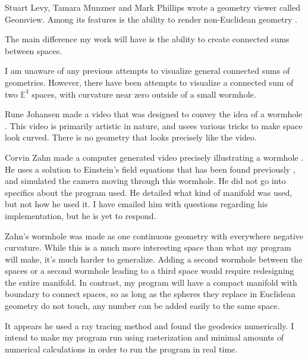 \documentclass[12pt]{amsart}
\begin{document}
Stuart Levy, Tamara Munzner and Mark Phillips wrote a geometry viewer called Geomview. Among its features is the ability to render non-Euclidean geometry \cite{Geomview}.

The main difference my work will have is the ability to create connected sums between spaces.



I am unaware of any previous attempts to visualize general connected sums of geometries. However, there have been attempts to visualize a connected sum of two $\mathbb{E}^3$ spaces, with curvature near zero outside of a small wormhole.

Rune Johansen made a video that was designed to convey the idea of a wormhole \cite{runevision}. This video is primarily artistic in nature, and usees various tricks to make space look curved. There is no geometry that looks precisely like the video.

Corvin Zahn made a computer generated video precisely illustrating a wormhole \cite{spacetimetravel}. He uses a solution to Einstein's field equations that has been found previously \cite{WormholeSolution}, and simulated the camera moving through this wormhole. He did not go into specifics about the program used. He detailed what kind of manifold was used, but not how he used it. I have emailed him with questions regarding his implementation, but he is yet to respond.

Zahn's wormhole was made as one continuous geometry with everywhere negative curvature. While this is a much more interesting space than what my program will make, it's much harder to generalize. Adding a second wormhole between the spaces or a second wormhole leading to a third space would require redesigning the entire manifold. In contrast, my program will have a compact manifold with boundary to connect spaces, so as long as the spheres they replace in Euclidean geometry do not touch, any number can be added easily to the same space.

It appears he used a ray tracing method and found the geodesics numerically. I intend to make my program run using rasterization and minimal amounts of numerical calculations in order to run the program in real time.







\end{document}
